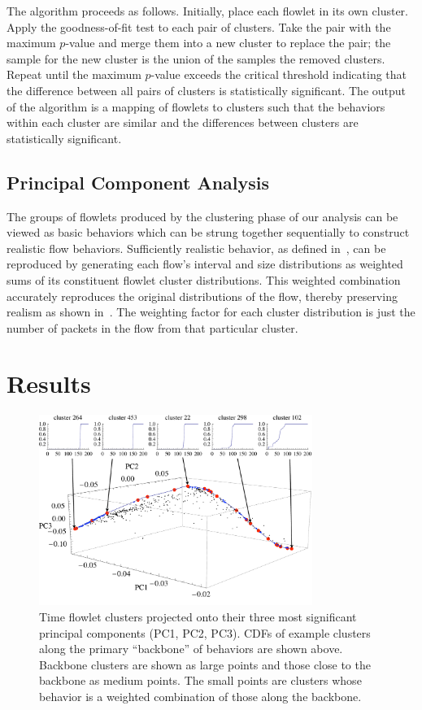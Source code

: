 \documentclass[conference]{IEEEtran}
\begin{document}
The algorithm proceeds as follows. Initially, place each flowlet in its own cluster. Apply the goodness-of-fit test to each pair of clusters. Take the pair with the maximum $p$-value and merge them into a new cluster to replace the pair; the sample for the new cluster is the union of the samples the removed clusters. Repeat until the maximum $p$-value exceeds the critical threshold indicating that the difference between all pairs of clusters is statistically significant. The output of the algorithm is a mapping of flowlets to clusters such that the behaviors within each cluster are similar and the differences between clusters are statistically significant.

\subsection{Principal Component Analysis}

The groups of flowlets produced by the clustering phase of our analysis can be viewed as basic behaviors which can be strung together sequentially to construct realistic flow behaviors. Sufficiently realistic behavior, as defined in~\cite{Karpinski07:cbr-failure}, can be reproduced by generating each flow's interval and size distributions as weighted sums of its constituent flowlet cluster distributions. This weighted combination accurately reproduces the original distributions of the flow, thereby preserving realism as shown in~\cite{Karpinski07:realism}. The weighting factor for each cluster distribution is just the number of packets in the flow from that particular cluster.

\section{Results}\label{sec:results}

\begin{figure}
\begin{center}
\includegraphics[width=3.5in]{time_pca_3d}%
\caption{Time flowlet clusters projected onto their three most significant principal components ({\footnotesize{PC1}}, {\footnotesize{PC2}}, {\footnotesize{PC3}}). {\footnotesize{CDF}}s of example clusters along the primary ``backbone'' of behaviors are shown above. Backbone clusters are shown as large points and those close to the backbone as medium points. The small points are clusters whose behavior is a weighted combination of those along the backbone.}
\label{fig:time-pca-3d}
\end{center}
\vspace{-2em}
\end{figure}
\end{document}
